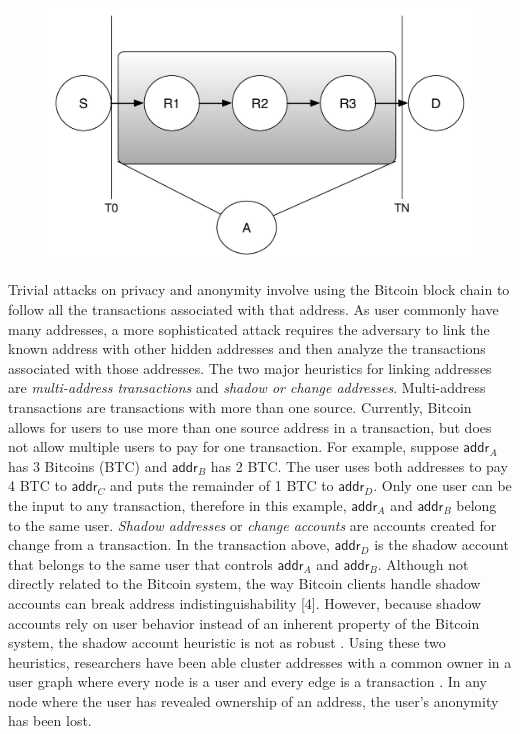 \begin{figure}
\begin{center}
\includegraphics[scale=0.40]{images/tor_attack.pdf}
\label{TODO.}
\label{fig:tor-end-to-end}
\end{center}
\end{figure}

Trivial attacks on privacy and anonymity involve using the Bitcoin block chain to follow all the transactions associated with that address. As user commonly have many addresses, a more sophisticated attack requires the adversary to link the known address with other hidden addresses and then analyze the transactions associated with those addresses. The two major heuristics for linking addresses are \emph{multi-address transactions} and \emph{shadow or change addresses}. Multi-address transactions are transactions with more than one source. Currently, Bitcoin allows for users to use more than one source address in a transaction, but does not allow multiple users to pay for one transaction. For example, suppose $\mathsf{addr}_A$ has 3 Bitcoins (BTC) and $\mathsf{addr}_B$ has 2 BTC. The user uses both addresses to pay 4 BTC to $\mathsf{addr}_C$ and puts the remainder of 1 BTC to $\mathsf{addr}_D$. Only one user can be the input to any transaction, therefore in this example, $\mathsf{addr}_A$ and $\mathsf{addr}_B$ belong to the same user. \emph{Shadow addresses} or \emph{change accounts} are accounts created for change from a transaction. In the transaction above, $\mathsf{addr}_D$ is the shadow account that belongs to the same user that controls $\mathsf{addr}_A$ and $\mathsf{addr}_B$. Although not directly related to the Bitcoin system, the way Bitcoin clients handle shadow accounts can break address indistinguishability [4]. However, because shadow accounts rely on user behavior instead of an inherent property of the Bitcoin system, the shadow account heuristic is not as robust \cite{Fistful12}. Using these two heuristics, researchers have been able cluster addresses with a common owner in a user graph where every node is a user and every edge is a transaction \cite{Shamir13-bitcoingraph,ReidHarrigan13,Fistful12}. In any node where the user has revealed ownership of an address, the user's anonymity has been lost.

